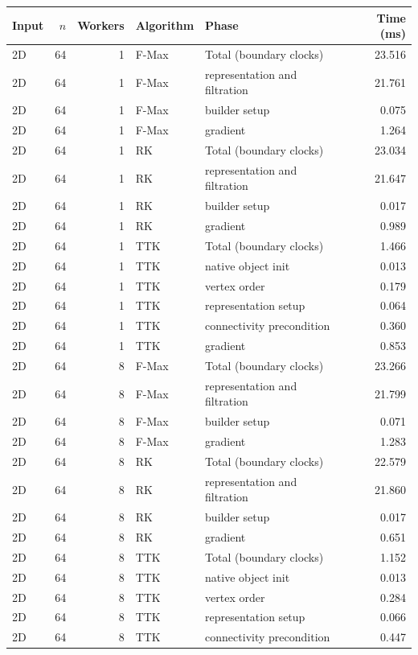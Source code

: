 \begin{tabular}{lrrllr}
\hline
Input & $n$ & Workers & Algorithm & Phase & Time (ms) \\
\hline
2D & 64 & 1 & F-Max & Total (boundary clocks) & 23.516 \\
2D & 64 & 1 & F-Max & representation and filtration & 21.761 \\
2D & 64 & 1 & F-Max & builder setup & 0.075 \\
2D & 64 & 1 & F-Max & gradient & 1.264 \\
2D & 64 & 1 & RK & Total (boundary clocks) & 23.034 \\
2D & 64 & 1 & RK & representation and filtration & 21.647 \\
2D & 64 & 1 & RK & builder setup & 0.017 \\
2D & 64 & 1 & RK & gradient & 0.989 \\
2D & 64 & 1 & TTK & Total (boundary clocks) & 1.466 \\
2D & 64 & 1 & TTK & native object init & 0.013 \\
2D & 64 & 1 & TTK & vertex order & 0.179 \\
2D & 64 & 1 & TTK & representation setup & 0.064 \\
2D & 64 & 1 & TTK & connectivity precondition & 0.360 \\
2D & 64 & 1 & TTK & gradient & 0.853 \\
2D & 64 & 8 & F-Max & Total (boundary clocks) & 23.266 \\
2D & 64 & 8 & F-Max & representation and filtration & 21.799 \\
2D & 64 & 8 & F-Max & builder setup & 0.071 \\
2D & 64 & 8 & F-Max & gradient & 1.283 \\
2D & 64 & 8 & RK & Total (boundary clocks) & 22.579 \\
2D & 64 & 8 & RK & representation and filtration & 21.860 \\
2D & 64 & 8 & RK & builder setup & 0.017 \\
2D & 64 & 8 & RK & gradient & 0.651 \\
2D & 64 & 8 & TTK & Total (boundary clocks) & 1.152 \\
2D & 64 & 8 & TTK & native object init & 0.013 \\
2D & 64 & 8 & TTK & vertex order & 0.284 \\
2D & 64 & 8 & TTK & representation setup & 0.066 \\
2D & 64 & 8 & TTK & connectivity precondition & 0.447 \\

\end{tabular}
